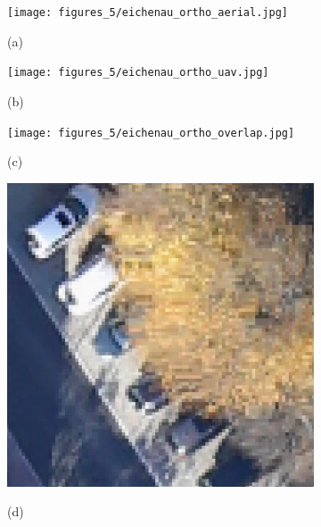 \begin{figure}[tbp]
    \centering
       \begin{subfigure}[b]{0.32\columnwidth}
           \centering
           \texttt{[image: figures\_5/eichenau\_ortho\_aerial.jpg]}
           {{\small }}    
           \centerline{\small{(a)}}\medskip
       \end{subfigure}
       \hfill
       \begin{subfigure}[b]{0.32\columnwidth}  
           \centering 
           \texttt{[image: figures\_5/eichenau\_ortho\_uav.jpg]}           
           {{\small }}    
           \centerline{\small{(b)}}\medskip
       \end{subfigure}
       \hfill
       \begin{subfigure}[b]{0.32\columnwidth}
           \centering
           \texttt{[image: figures\_5/eichenau\_ortho\_overlap.jpg]}
           {{\small }}    
           \centerline{\small{(c)}}\medskip
       \end{subfigure}
       \begin{subfigure}[tbp]{0.236\columnwidth}
           \centering
           \includegraphics[width=\textwidth]{figures_5/eichenau_car_aerial.png}
           {{\small }}    
           \centerline{\small{(d)}}\medskip
       \end{subfigure}
       \hfill
       \begin{subfigure}[tbp]{0.236\columnwidth}

\end{subfigure}
\end{figure}
